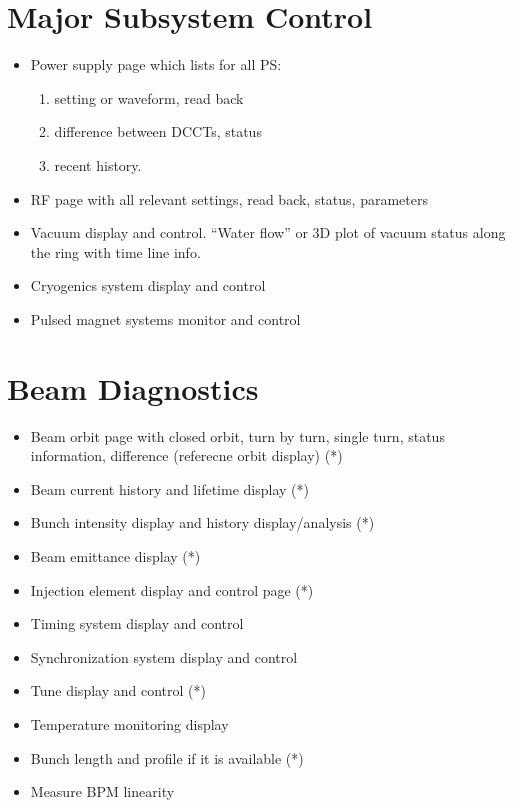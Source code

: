 \documentclass[letterpaper,showtrims]{memoir}
\begin{document}
\section{Major Subsystem Control}

\begin{itemize}
\item Power supply page which lists for all PS:
      \begin{enumerate}
      \item setting or waveform, read back
      \item difference between DCCTs, status
      \item recent history.
      \end{enumerate}
\item RF page with all relevant settings, read back, status, parameters
\item Vacuum display and control. ``Water flow'' or 3D plot of vacuum status along the ring with time line info.
\item Cryogenics system display and control
\item Pulsed magnet systems monitor and control
\end{itemize}


\section{Beam Diagnostics}

\begin{itemize}
\item Beam orbit page with closed orbit, turn by turn, single turn, status information, difference (referecne orbit display) (*)
\item Beam current history and lifetime display (*)
\item Bunch intensity display and history display/analysis (*)
\item Beam emittance display (*)
\item Injection element display and control page (*)
\item Timing system display and control 
\item Synchronization system display and control
\item Tune display and control (*)
\item Temperature monitoring display
\item Bunch length and profile if it is available (*)
\item Measure BPM linearity
\end{itemize}
\end{document}
